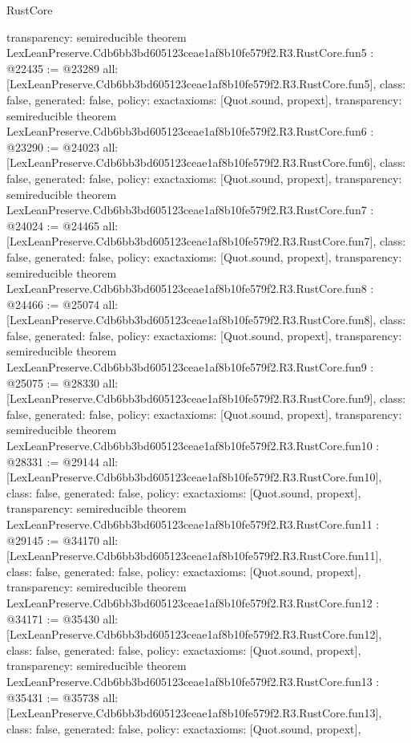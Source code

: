 \begin{lexlean}{RustCore}
\begin{coremodule}
{  transparency: semireducible
}
theorem LexLeanPreserve.Cdb6bb3bd605123ceae1af8b10fe579f2.R3.RustCore.fun5 : @22435 := @23289 {
  all: [LexLeanPreserve.Cdb6bb3bd605123ceae1af8b10fe579f2.R3.RustCore.fun5],
  class: false,
  generated: false,
  policy: exact{axioms: [Quot.sound, propext]},
  transparency: semireducible
}
theorem LexLeanPreserve.Cdb6bb3bd605123ceae1af8b10fe579f2.R3.RustCore.fun6 : @23290 := @24023 {
  all: [LexLeanPreserve.Cdb6bb3bd605123ceae1af8b10fe579f2.R3.RustCore.fun6],
  class: false,
  generated: false,
  policy: exact{axioms: [Quot.sound, propext]},
  transparency: semireducible
}
theorem LexLeanPreserve.Cdb6bb3bd605123ceae1af8b10fe579f2.R3.RustCore.fun7 : @24024 := @24465 {
  all: [LexLeanPreserve.Cdb6bb3bd605123ceae1af8b10fe579f2.R3.RustCore.fun7],
  class: false,
  generated: false,
  policy: exact{axioms: [Quot.sound, propext]},
  transparency: semireducible
}
theorem LexLeanPreserve.Cdb6bb3bd605123ceae1af8b10fe579f2.R3.RustCore.fun8 : @24466 := @25074 {
  all: [LexLeanPreserve.Cdb6bb3bd605123ceae1af8b10fe579f2.R3.RustCore.fun8],
  class: false,
  generated: false,
  policy: exact{axioms: [Quot.sound, propext]},
  transparency: semireducible
}
theorem LexLeanPreserve.Cdb6bb3bd605123ceae1af8b10fe579f2.R3.RustCore.fun9 : @25075 := @28330 {
  all: [LexLeanPreserve.Cdb6bb3bd605123ceae1af8b10fe579f2.R3.RustCore.fun9],
  class: false,
  generated: false,
  policy: exact{axioms: [Quot.sound, propext]},
  transparency: semireducible
}
theorem LexLeanPreserve.Cdb6bb3bd605123ceae1af8b10fe579f2.R3.RustCore.fun10 : @28331 := @29144 {
  all: [LexLeanPreserve.Cdb6bb3bd605123ceae1af8b10fe579f2.R3.RustCore.fun10],
  class: false,
  generated: false,
  policy: exact{axioms: [Quot.sound, propext]},
  transparency: semireducible
}
theorem LexLeanPreserve.Cdb6bb3bd605123ceae1af8b10fe579f2.R3.RustCore.fun11 : @29145 := @34170 {
  all: [LexLeanPreserve.Cdb6bb3bd605123ceae1af8b10fe579f2.R3.RustCore.fun11],
  class: false,
  generated: false,
  policy: exact{axioms: [Quot.sound, propext]},
  transparency: semireducible
}
theorem LexLeanPreserve.Cdb6bb3bd605123ceae1af8b10fe579f2.R3.RustCore.fun12 : @34171 := @35430 {
  all: [LexLeanPreserve.Cdb6bb3bd605123ceae1af8b10fe579f2.R3.RustCore.fun12],
  class: false,
  generated: false,
  policy: exact{axioms: [Quot.sound, propext]},
  transparency: semireducible
}
theorem LexLeanPreserve.Cdb6bb3bd605123ceae1af8b10fe579f2.R3.RustCore.fun13 : @35431 := @35738 {
  all: [LexLeanPreserve.Cdb6bb3bd605123ceae1af8b10fe579f2.R3.RustCore.fun13],
  class: false,
  generated: false,
  policy: exact{axioms: [Quot.sound, propext]},
}
\end{coremodule}
\end{lexlean}
